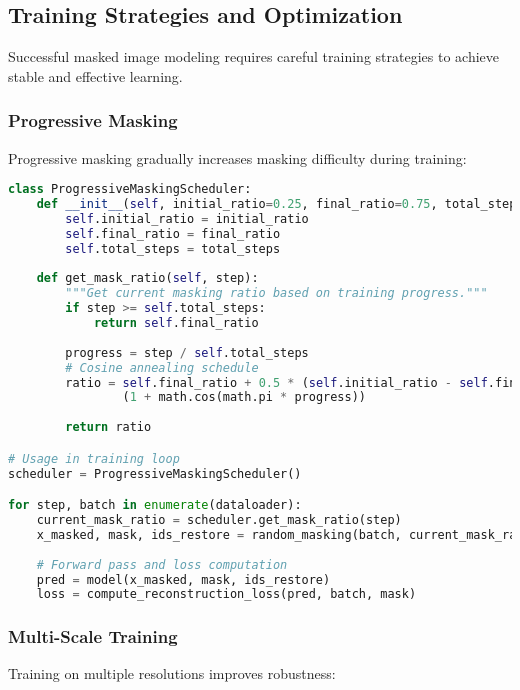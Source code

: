 \subsection{Training Strategies and Optimization}

Successful masked image modeling requires careful training strategies to achieve stable and effective learning.

\subsubsection{Progressive Masking}

Progressive masking gradually increases masking difficulty during training:

\begin{lstlisting}[language=Python, caption=Progressive masking curriculum for stable training]
class ProgressiveMaskingScheduler:
    def __init__(self, initial_ratio=0.25, final_ratio=0.75, total_steps=100000):
        self.initial_ratio = initial_ratio
        self.final_ratio = final_ratio
        self.total_steps = total_steps
    
    def get_mask_ratio(self, step):
        """Get current masking ratio based on training progress."""
        if step >= self.total_steps:
            return self.final_ratio
        
        progress = step / self.total_steps
        # Cosine annealing schedule
        ratio = self.final_ratio + 0.5 * (self.initial_ratio - self.final_ratio) * \
                (1 + math.cos(math.pi * progress))
        
        return ratio

# Usage in training loop
scheduler = ProgressiveMaskingScheduler()

for step, batch in enumerate(dataloader):
    current_mask_ratio = scheduler.get_mask_ratio(step)
    x_masked, mask, ids_restore = random_masking(batch, current_mask_ratio)
    
    # Forward pass and loss computation
    pred = model(x_masked, mask, ids_restore)
    loss = compute_reconstruction_loss(pred, batch, mask)
\end{lstlisting}

\subsubsection{Multi-Scale Training}

Training on multiple resolutions improves robustness:

